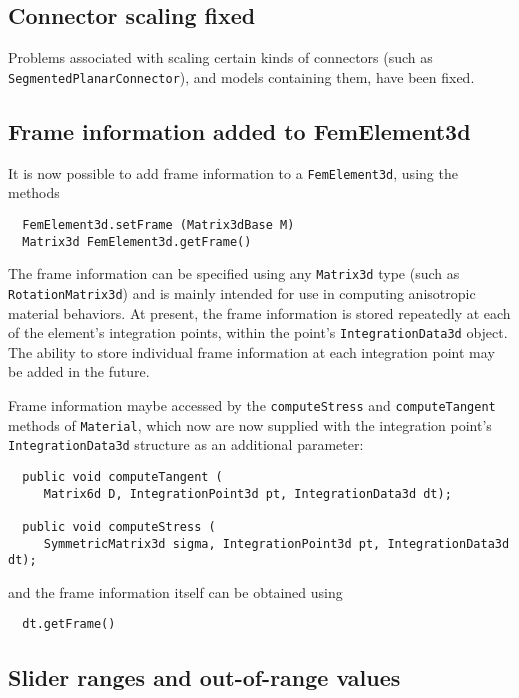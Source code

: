 \documentclass{article}
\begin{document}
\subsection*{Connector scaling fixed}

Problems associated with scaling certain kinds of connectors (such as
{\tt SegmentedPlanarConnector}), and models containing them, have been fixed.

\subsection*{Frame information added to FemElement3d}

It is now possible to add frame information to a {\tt FemElement3d},
using the methods

\begin{lstlisting}
  FemElement3d.setFrame (Matrix3dBase M)
  Matrix3d FemElement3d.getFrame()
\end{lstlisting}

The frame information can be specified using any {\tt Matrix3d} type (such
as {\tt RotationMatrix3d}) and is mainly intended for use in computing
anisotropic material behaviors. At present, the frame information is
stored repeatedly at each of the element's integration points, within
the point's {\tt IntegrationData3d} object. The ability to store individual frame
information at each integration point may be added in the
future.

Frame information maybe accessed by the {\tt computeStress} and
{\tt computeTangent} methods of {\tt Material}, which now are now supplied
with the integration point's {\tt IntegrationData3d} structure as an
additional parameter:

\begin{lstlisting}
  public void computeTangent (
     Matrix6d D, IntegrationPoint3d pt, IntegrationData3d dt);
  
  public void computeStress (
     SymmetricMatrix3d sigma, IntegrationPoint3d pt, IntegrationData3d dt);  
\end{lstlisting}

and the frame information itself can be obtained using

\begin{lstlisting}
  dt.getFrame()
\end{lstlisting}
 
\subsection*{Slider ranges and out-of-range values}
\end{document}
